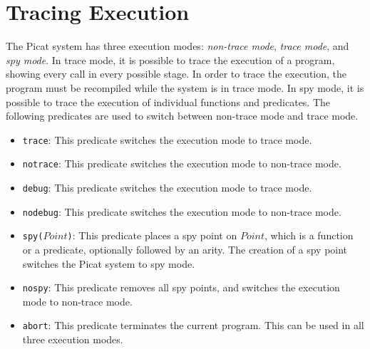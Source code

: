 \section{Tracing Execution}
The Picat system has three execution modes: \textit{non-trace mode}, \textit{trace mode}, and \textit{spy mode}.  In trace mode, it is possible to trace the execution of a program, showing every call in every possible stage.  In order to trace the execution, the program must be recompiled while the system is in trace mode.  In spy mode, it is possible to trace the execution of individual functions and predicates.  The following predicates are used to switch between non-trace mode and trace mode.
\begin{itemize}
\item \texttt{trace}: This predicate switches the execution mode to trace mode.
\item \texttt{notrace}: This predicate switches the execution mode to non-trace mode.
\item \texttt{debug}: This predicate switches the execution mode to trace mode.
\item \texttt{nodebug}: This predicate switches the execution mode to non-trace mode.
\item \texttt{spy($Point$)}: This predicate places a spy point on $Point$, which is a function or a predicate, optionally followed by an arity.  The creation of a spy point switches the Picat system to spy mode.
\item \texttt{nospy}: This predicate removes all spy points, and switches the execution mode to non-trace mode.
\item \texttt{abort}: This predicate terminates the current program.  This can be used in all three execution modes.
\end{itemize}

